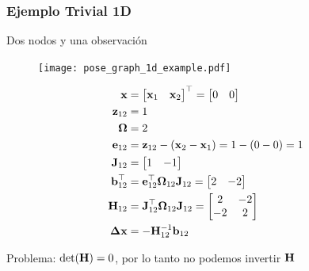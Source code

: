 \begin{frame}
    \frametitle{Ejemplo Trivial 1D}
    
    Dos nodos y una observación

     \begin{figure}[!h]
        \texttt{[image: pose\_graph\_1d\_example.pdf]}
    \end{figure}

    \small

    \begin{align*}
        \boldsymbol{\mathbf{x}} &=
        \begin{bmatrix}
            \boldsymbol{\mathbf{x}}_{1} & \boldsymbol{\mathbf{x}}_{2}
        \end{bmatrix}^{\top}
        =
        \begin{bmatrix}
            0 & 0
        \end{bmatrix}\\
        \boldsymbol{\mathbf{z}}_{12} &= 1\\
        \boldsymbol{\mathbf{\Omega}} &= 2\\
        \boldsymbol{\mathbf{e}}_{12} &= \boldsymbol{\mathbf{z}}_{12} - (\boldsymbol{\mathbf{x}}_{2} - \boldsymbol{\mathbf{x}}_{1}) = 1 - (0 - 0) = 1\\
        \boldsymbol{\mathbf{J}}_{12} &=
        \begin{bmatrix}
            1 & -1
        \end{bmatrix}\\
        \boldsymbol{\mathbf{b}}_{12}^{\top} &= \boldsymbol{\mathbf{e}}_{12}^{\top} \boldsymbol{\mathbf{\Omega}}_{12} \boldsymbol{\mathbf{J}}_{12} =
        \begin{bmatrix}
            2 & -2
        \end{bmatrix}\\
        \boldsymbol{\mathbf{H}}_{12} &= \boldsymbol{\mathbf{J}}_{12}^{\top} \boldsymbol{\mathbf{\Omega}}_{12} \boldsymbol{\mathbf{J}}_{12} = 
        \begin{bmatrix}
            2 & -2\\
            -2 & 2
        \end{bmatrix}\\
    \boldsymbol{\mathbf{\Delta}}\boldsymbol{\mathbf{x}} &= -{\boldsymbol{\mathbf{H}}}^{-1}_{12} \boldsymbol{\mathbf{b}}_{12}\\
    \end{align*}

    \begin{center}
    \alert{Problema:} $\det(\boldsymbol{\mathbf{H}}) = 0$, por lo tanto no podemos invertir $\boldsymbol{\mathbf{H}}$
    \end{center}
\end{frame}

